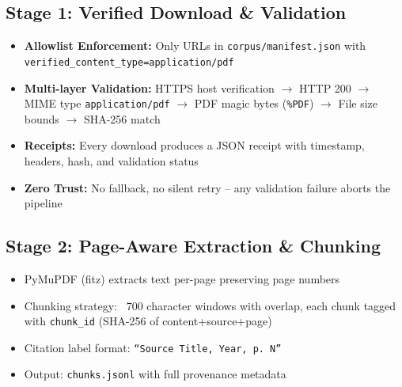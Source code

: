 \documentclass[11pt,a4paper]{article}
\begin{document}
\subsection{Stage 1: Verified Download \& Validation}
\begin{nvidiabox}
\begin{itemize}[label=\textcolor{nvidiaGreen}{$\bullet$}, leftmargin=*]
    \item \textbf{Allowlist Enforcement:} Only URLs in \texttt{corpus/manifest.json} with \texttt{verified\_content\_type=application/pdf}
    \item \textbf{Multi-layer Validation:} HTTPS host verification $\to$ HTTP 200 $\to$ MIME type \texttt{application/pdf} $\to$ PDF magic bytes (\texttt{\%PDF}) $\to$ File size bounds $\to$ SHA-256 match
    \item \textbf{Receipts:} Every download produces a JSON receipt with timestamp, headers, hash, and validation status
    \item \textbf{Zero Trust:} No fallback, no silent retry -- any validation failure aborts the pipeline
\end{itemize}
\end{nvidiabox}

\subsection{Stage 2: Page-Aware Extraction \& Chunking}
\begin{itemize}[label=\textcolor{nvidiaGreen}{$\triangleright$}, leftmargin=*]
    \item PyMuPDF (fitz) extracts text per-page preserving page numbers
    \item Chunking strategy: ~700 character windows with overlap, each chunk tagged with \texttt{chunk\_id} (SHA-256 of content+source+page)
    \item Citation label format: \texttt{``Source Title, Year, p. N''}
    \item Output: \texttt{chunks.jsonl} with full provenance metadata
\end{itemize}
\end{document}
